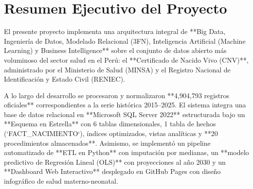\documentclass[12pt,a4paper]{article}
\begin{document}
\newpage
\tableofcontents
\newpage

\section{Resumen Ejecutivo del Proyecto}

El presente proyecto implementa una arquitectura integral de **Big Data, Ingeniería de Datos, Modelado Relacional (3FN), Inteligencia Artificial (Machine Learning) y Business Intelligence** sobre el conjunto de datos abierto más voluminoso del sector salud en el Perú: el **Certificado de Nacido Vivo (CNV)**, administrado por el Ministerio de Salud (MINSA) y el Registro Nacional de Identificación y Estado Civil (RENIEC).

A lo largo del desarrollo se procesaron y normalizaron **4,904,793 registros oficiales** correspondientes a la serie histórica 2015--2025. El sistema integra una base de datos relacional en **Microsoft SQL Server 2022** estructurada bajo un **Esquema en Estrella** con 6 tablas dimensionales, 1 tabla de hechos (`FACT_NACIMIENTO`), índices optimizados, vistas analíticas y **20 procedimientos almacenados**. Asimismo, se implementó un pipeline automatizado de **ETL en Python** con imputación por medianas, un **modelo predictivo de Regresión Lineal (OLS)** con proyecciones al año 2030 y un **Dashboard Web Interactivo** desplegado en GitHub Pages con diseño infográfico de salud materno-neonatal.
\end{document}
